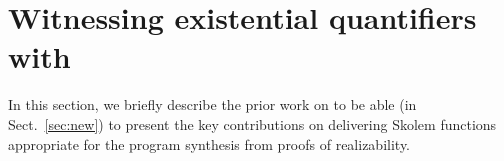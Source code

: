 \section{Witnessing existential quantifiers with \aeval}
\label{sec:aeval}


In this section, we briefly describe the prior work on \aeval to be able (in Sect.~\ref{sec:new}) to present the key contributions on delivering Skolem functions appropriate for the program synthesis from proofs of realizability.

